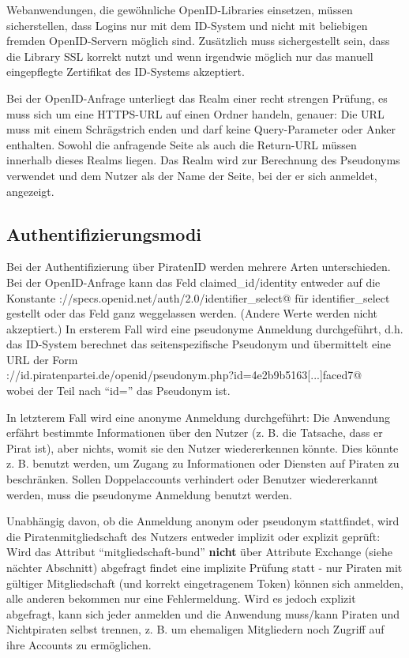 \documentclass[parskip=half]{scrartcl}
\begin{document}
Webanwendungen, die gewöhnliche OpenID-Libraries einsetzen, müssen sicherstellen, dass Logins nur mit dem ID-System und nicht mit beliebigen fremden OpenID-Servern möglich sind.
Zusätzlich muss sichergestellt sein, dass die Library SSL korrekt nutzt und wenn irgendwie möglich nur das manuell eingepflegte Zertifikat des ID-Systems akzeptiert.

Bei der OpenID-Anfrage unterliegt das Realm einer recht strengen Prüfung, es muss sich um eine HTTPS-URL auf einen Ordner handeln, genauer:
Die URL muss mit einem Schrägstrich enden und darf keine Query-Parameter oder Anker enthalten.
Sowohl die anfragende Seite als auch die Return-URL müssen innerhalb dieses Realms liegen.
Das Realm wird zur Berechnung des Pseudonyms verwendet und dem Nutzer als der Name der Seite, bei der er sich anmeldet, angezeigt.


\subsection{Authentifizierungsmodi}
Bei der Authentifizierung über PiratenID werden mehrere Arten unterschieden.
Bei der OpenID-Anfrage kann das Feld claimed\_id/identity entweder auf die Konstante \verb@http://specs.openid.net/auth/2.0/identifier\_select@
für identifier\_select gestellt oder das Feld ganz weggelassen werden. (Andere Werte werden nicht akzeptiert.)
In ersterem Fall wird eine pseudonyme Anmeldung durchgeführt, d.h. das ID-System berechnet das seitenspezifische Pseudonym und übermittelt eine URL der Form\\
\verb@https://id.piratenpartei.de/openid/pseudonym.php?id=4e2b9b5163[...]faced7@\\
wobei der Teil nach "`id="' das Pseudonym ist.

In letzterem Fall wird eine anonyme Anmeldung durchgeführt:
Die Anwendung erfährt bestimmte Informationen über den Nutzer (z. B. die Tatsache, dass er Pirat ist), aber nichts, womit sie den Nutzer wiedererkennen könnte.
Dies könnte z. B. benutzt werden, um Zugang zu Informationen oder Diensten auf Piraten zu beschränken.
Sollen Doppelaccounts verhindert oder Benutzer wiedererkannt werden, muss die pseudonyme Anmeldung benutzt werden.

Unabhängig davon, ob die Anmeldung anonym oder pseudonym stattfindet, wird die Piratenmitgliedschaft des Nutzers entweder implizit oder explizit geprüft:
Wird das Attribut "`mitgliedschaft-bund"' \textbf{nicht} über Attribute Exchange (siehe nächter Abschnitt) abgefragt findet eine implizite Prüfung statt - 
nur Piraten mit gültiger Mitgliedschaft (und korrekt eingetragenem Token) können sich anmelden, alle anderen bekommen nur eine Fehlermeldung.
Wird es jedoch explizit abgefragt, kann sich jeder anmelden und die Anwendung muss/kann Piraten und Nichtpiraten selbst trennen,
z. B. um ehemaligen Mitgliedern noch Zugriff auf ihre Accounts zu ermöglichen.
\end{document}
